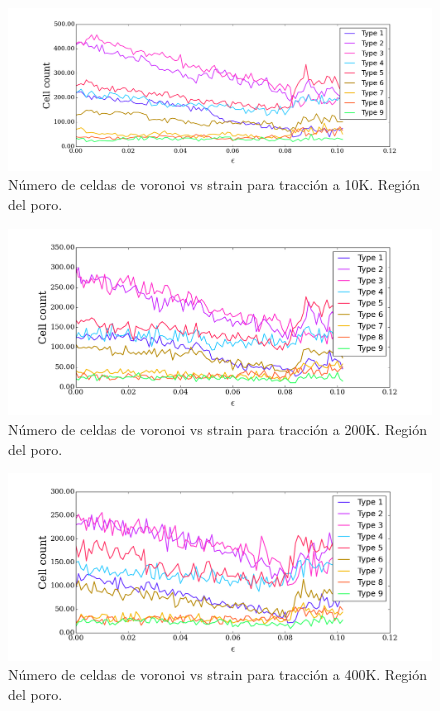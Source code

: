 \documentclass[10pt, oneside]{article} %
\begin{document}
\begin{figure}[H]
\centering
\includegraphics[width=15cm]{Figures/NanoParticles/voro_void_10K.png}
\caption{Número de celdas de voronoi vs strain para tracción a 10K. Región del poro.}
\end{figure}

\begin{figure}[H]
\centering
\includegraphics[width=15cm]{Figures/NanoParticles/voro_void_200K.png}
\caption{Número de celdas de voronoi vs strain para tracción a 200K. Región del poro.}
\end{figure}

\begin{figure}[H]
\centering
\includegraphics[width=15cm]{Figures/NanoParticles/voro_void_400K.png}
\caption{Número de celdas de voronoi vs strain para tracción a 400K. Región del poro.}
\end{figure}
\end{document}
